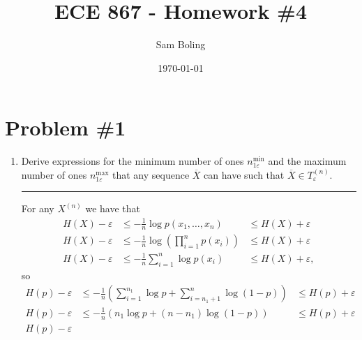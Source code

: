 \documentclass{article}
\title{ECE 867 - Homework \#4}
\author{Sam Boling}
\date{\today}
\newcommand{\horline}
           {\begin{center}
              \noindent\rule{8cm}{0.4pt}
            \end{center}}
\begin{document}
\maketitle

\section{Problem \#1}

\begin{enumerate}
  \item{Derive expressions for the minimum number of ones 
  $n_{1\varepsilon}^{\mathrm{min}}$ and the maximum number of ones
  $n_{1\varepsilon}^{\mathrm{max}}$ that any sequence $\overline{X}$ can
  have such that $\overline{X} \in T_{\varepsilon}^{(n)}$. 
  \horline
  For any $X^{(n)}$ we have that
  \begin{align*}
  H(X) - \varepsilon & \leq -\frac{1}{n}\log p(x_1, \dots, x_n)
                     & \leq H(X) + \varepsilon \\
  H(X) - \varepsilon & \leq 
       -\frac{1}{n}\log \left(\prod_{i=1}^{n} p(x_i)\right) 
                     & \leq H(X) + \varepsilon \\
  H(X) - \varepsilon & \leq 
       -\frac{1}{n}\sum_{i=1}^{n}\log p(x_i) & \leq H(X) + \varepsilon,
  \end{align*}
  so 
  \begin{align*}
  H(p) - \varepsilon & \leq 
       -\frac{1}{n}\left(\sum_{i=1}^{n_1} \log p 
                       + \sum_{i={n_1+1}}^{n} \log (1 - p)\right)
                     & \leq H(p) + \varepsilon \\
  H(p) - \varepsilon & \leq
       -\frac{1}{n}\left(n_1 \log p + (n - n_1) \log (1 - p)\right)
                     & \leq H(p) + \varepsilon \\
  H(p) - \varepsilon
  \end{align*}
  }
 
\end{enumerate}
\end{document}
